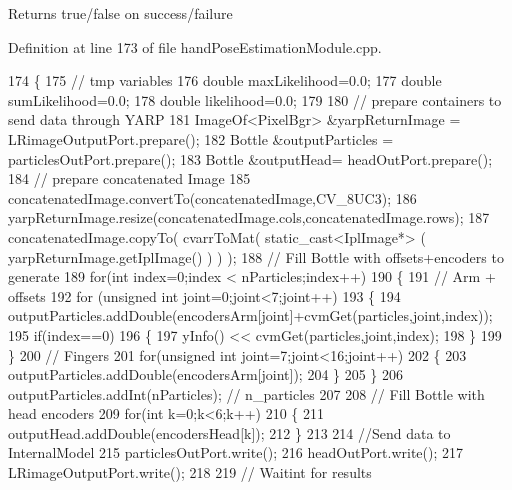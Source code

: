 \begin{DoxyReturn}{Returns}
true/false on success/failure 
\end{DoxyReturn}


Definition at line 173 of file hand\+Pose\+Estimation\+Module.\+cpp.


\begin{DoxyCode}
174 \{
175     \textcolor{comment}{// tmp variables}
176     \textcolor{keywordtype}{double} maxLikelihood=0.0;
177     \textcolor{keywordtype}{double} sumLikelihood=0.0;
178     \textcolor{keywordtype}{double} likelihood=0.0;
179 
180     \textcolor{comment}{// prepare containers to send data through YARP}
181     ImageOf<PixelBgr> &yarpReturnImage = LRimageOutputPort.prepare();
182     Bottle &outputParticles = particlesOutPort.prepare();
183     Bottle &outputHead= headOutPort.prepare();
184     \textcolor{comment}{// prepare concatenated Image}
185     concatenatedImage.convertTo(concatenatedImage,CV\_8UC3);
186     yarpReturnImage.resize(concatenatedImage.cols,concatenatedImage.rows);
187     concatenatedImage.copyTo( cvarrToMat( static\_cast<IplImage*> ( yarpReturnImage.getIplImage() ) ) );
188     \textcolor{comment}{// Fill Bottle with offsets+encoders to generate}
189     \textcolor{keywordflow}{for}(\textcolor{keywordtype}{int} index=0;index < nParticles;index++) 
190     \{
191         \textcolor{comment}{// Arm + offsets}
192         \textcolor{keywordflow}{for} (\textcolor{keywordtype}{unsigned} \textcolor{keywordtype}{int} joint=0;joint<7;joint++) 
193         \{
194             outputParticles.addDouble(encodersArm[joint]+cvmGet(particles,joint,index));
195             \textcolor{keywordflow}{if}(index==0)
196             \{
197                 yInfo() << cvmGet(particles,joint,index);
198             \}
199         \}
200         \textcolor{comment}{// Fingers}
201         \textcolor{keywordflow}{for}(\textcolor{keywordtype}{unsigned} \textcolor{keywordtype}{int} joint=7;joint<16;joint++) 
202         \{
203             outputParticles.addDouble(encodersArm[joint]);
204         \}
205     \}
206     outputParticles.addInt(nParticles); \textcolor{comment}{// n\_particles}
207 
208     \textcolor{comment}{// Fill Bottle with head encoders}
209     \textcolor{keywordflow}{for}(\textcolor{keywordtype}{int} k=0;k<6;k++)
210     \{
211         outputHead.addDouble(encodersHead[k]);
212     \}
213 
214     \textcolor{comment}{//Send data to InternalModel}
215     particlesOutPort.write();
216     headOutPort.write();  
217     LRimageOutputPort.write();
218 
219     \textcolor{comment}{// Waitint for results}

\end{DoxyCode}
